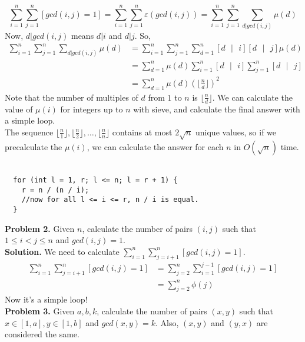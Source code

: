 \documentclass[11pt]{article}
\begin{document}
  $$\sum_{i = 1}^{n} \sum_{j = 1}^{n} [gcd(i, j) = 1] = \sum_{i = 1}^{n} \sum_{j = 1}^{n} \varepsilon(gcd(i, j)) = \sum_{i = 1}^{n} \sum_{j = 1}^{n} \sum_{d | gcd(i, j)} \mu(d)$$
Now, $d|gcd(i, j)$ means $d | i$ and $d|j$. So, 
\begin{align*}
\sum_{i = 1}^{n} \sum_{j = 1}^{n} \sum_{d | gcd(i, j)} \mu(d) &= \sum_{i = 1}^{n} \sum_{j = 1}^{n} \sum_{d = 1}^{n} [d \text{ } | \text{ } i] [d \text{ }| \text{ } j] \mu(d)\\
                                                              &= \sum_{d = 1}^{n} \mu(d) \sum_{i = 1}^{n} [d \text{ }|\text{ } i] \sum_{j = 1}^{n} [d \text{ }|\text{ } j] \\
                                                              &= \sum_{d = 1}^{n} \mu(d) {(\lfloor \frac{n}{d} \rfloor)}^2
\end{align*}
Note that the number of multiples of $d$ from $1$ to $n$ is $\lfloor \frac{n}{d} \rfloor$. We can calculate the value of $\mu(i)$ for integers up to $n$ with sieve, and calculate the final answer with a simple loop. \\
The sequence $\lfloor \frac{n}{1} \rfloor, \lfloor \frac{n}{2} \rfloor, \dots, \lfloor \frac{n}{n} \rfloor$ contains at most $2\sqrt{n}$ unique values, so if we precalculate the $\mu(i)$, we can calculate the answer for each $n$ in $O(\sqrt{n})$ time.\\ \\
\begin{verbatim}
  for (int l = 1, r; l <= n; l = r + 1) {
    r = n / (n / i);
    //now for all l <= i <= r, n / i is equal.
  }
\end{verbatim}
\textbf{Problem 2.} Given $n$, calculate the number of pairs $(i, j)$ such that $1 \leq i < j \leq n$ and $gcd(i, j) = 1$. \\
\textbf{Solution.} We need to calculate $\sum_{i = 1}^{n} \sum_{j = i + 1}^{n} [gcd(i, j) = 1]$. \\
\begin{align*}
  \sum_{i = 1}^{n} \sum_{j = i + 1}^{n} [gcd(i, j) = 1] &= \sum_{j = 2}^{n} \sum_{i = 1}^{j - 1} [gcd(i, j) = 1]\\
                                                        &= \sum_{j = 2}^{n} \phi(j)
\end{align*}
Now it's a simple loop!\\
\textbf{Problem 3.} Given $a, b, k$, calculate the number of pairs $(x, y)$ such that $x \in [1, a], y \in [1, b]$ and $gcd(x, y) = k$. Also, $(x, y)$ and $(y, x)$ are considered the same.\\
\end{document}
